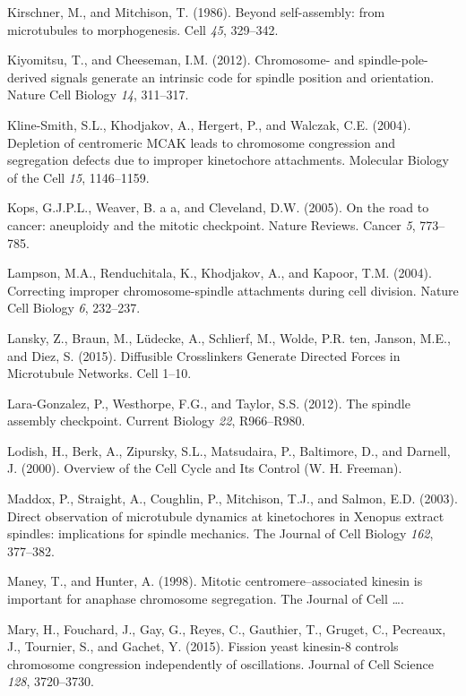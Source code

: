 \documentclass[12pt,a4paper,twoside,openright]{book}
\begin{document}
\hypertarget{ref-Kirschner1986}{}
Kirschner, M., and Mitchison, T. (1986). Beyond self-assembly: from
microtubules to morphogenesis. Cell \emph{45}, 329--342.

\hypertarget{ref-Kiyomitsu2012}{}
Kiyomitsu, T., and Cheeseman, I.M. (2012). Chromosome- and
spindle-pole-derived signals generate an intrinsic code for spindle
position and orientation. Nature Cell Biology \emph{14}, 311--317.

\hypertarget{ref-Kline-Smith2004}{}
Kline-Smith, S.L., Khodjakov, A., Hergert, P., and Walczak, C.E. (2004).
Depletion of centromeric MCAK leads to chromosome congression and
segregation defects due to improper kinetochore attachments. Molecular
Biology of the Cell \emph{15}, 1146--1159.

\hypertarget{ref-Kops2005}{}
Kops, G.J.P.L., Weaver, B. a a, and Cleveland, D.W. (2005). On the road
to cancer: aneuploidy and the mitotic checkpoint. Nature Reviews. Cancer
\emph{5}, 773--785.

\hypertarget{ref-Lampson2004}{}
Lampson, M.A., Renduchitala, K., Khodjakov, A., and Kapoor, T.M. (2004).
Correcting improper chromosome-spindle attachments during cell division.
Nature Cell Biology \emph{6}, 232--237.

\hypertarget{ref-Lansky2015}{}
Lansky, Z., Braun, M., Lüdecke, A., Schlierf, M., Wolde, P.R. ten,
Janson, M.E., and Diez, S. (2015). Diffusible Crosslinkers Generate
Directed Forces in Microtubule Networks. Cell 1--10.

\hypertarget{ref-Lara-Gonzalez2012}{}
Lara-Gonzalez, P., Westhorpe, F.G., and Taylor, S.S. (2012). The spindle
assembly checkpoint. Current Biology \emph{22}, R966--R980.

\hypertarget{ref-Lodish2000}{}
Lodish, H., Berk, A., Zipursky, S.L., Matsudaira, P., Baltimore, D., and
Darnell, J. (2000). Overview of the Cell Cycle and Its Control (W. H.
Freeman).

\hypertarget{ref-Maddox2003}{}
Maddox, P., Straight, A., Coughlin, P., Mitchison, T.J., and Salmon,
E.D. (2003). Direct observation of microtubule dynamics at kinetochores
in Xenopus extract spindles: implications for spindle mechanics. The
Journal of Cell Biology \emph{162}, 377--382.

\hypertarget{ref-Maney1998}{}
Maney, T., and Hunter, A. (1998). Mitotic centromere--associated kinesin
is important for anaphase chromosome segregation. The Journal of Cell
\ldots{}.

\hypertarget{ref-Mary2015}{}
Mary, H., Fouchard, J., Gay, G., Reyes, C., Gauthier, T., Gruget, C.,
Pecreaux, J., Tournier, S., and Gachet, Y. (2015). Fission yeast
kinesin-8 controls chromosome congression independently of oscillations.
Journal of Cell Science \emph{128}, 3720--3730.
\end{document}
